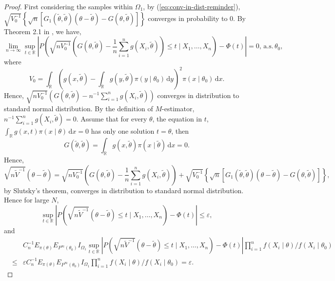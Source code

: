 \documentclass[oneside,english]{amsbook}
\numberwithin{section}{chapter}
\numberwithin{equation}{section}
\numberwithin{figure}{section}
\theoremstyle{plain}
\theoremstyle{plain}
\theoremstyle{definition}
\theoremstyle{plain}
\theoremstyle{plain}
\theoremstyle{remark}
\theoremstyle{definition}
\theoremstyle{definition}
\newcommand{\diff}{\,\mathrm{d}}
\newcommand{\ascv}{\,\mathrm{a.s.}\,}
\begin{document}
\begin{proof}
First considering the samples within $\Omega_{1}$, by (\ref{eq:conv-in-dist-reminder}),
$\sqrt{V_{0}^{-1}}\left\{ \sqrt{n}\left[G_{1}\left(\tilde{\theta},\tilde{\theta}\right)\left(\theta-\tilde{\theta}\right)-G\left(\theta,\tilde{\theta}\right)\right]\right\} $
converges in probability to 0. By Theorem 2.1 in \citet{rivoirard2012bernstein},
we have, 
\begin{equation}
\lim_{n\rightarrow\infty}\sup_{t\in\mathbb{R}}\left|P\left(\sqrt{nV_{0}^{-1}}\left(G\left(\theta,\tilde{\theta}\right)-\frac{1}{n}\sum_{i=1}^{n}g\left(X_{i},\tilde{\theta}\right)\right)\le t\mid X_{1},\ldots,X_{n}\right)-\Phi\left(t\right)\right|=0,\ascv\theta_{0},\label{eq:conv-in-dist-est-eq}
\end{equation}
where 
\[
V_{0}=\int_{\mathbb{R}}\left(g\left(x,\tilde{\theta}\right)-\int_{\mathbb{R}}g\left(y,\tilde{\theta}\right)\pi\left(y\mid\theta_{0}\right)\diff y\right)^{2}\pi\left(x\mid\theta_{0}\right)\diff x.
\]
Hence, $\sqrt{nV_{0}^{-1}}\left(G\left(\theta,\tilde{\theta}\right)-n^{-1}\sum_{i=1}^{n}g\left(X_{i},\tilde{\theta}\right)\right)$
converges in distribution to standard normal distribution. By the
definition of $M$-estimator, $n^{-1}\sum_{i=1}^{n}g\left(X_{i},\tilde{\theta}\right)=0$.
Assume that for every $\theta$, the equation in $t$, $\int_{\mathbb{R}}g\left(x,t\right)\pi\left(x\mid\theta\right)\diff x=0$
has only one solution $t=\theta$, then 
\[
G\left(\tilde{\theta},\tilde{\theta}\right)=\int_{\mathbb{R}}g\left(x,\tilde{\theta}\right)\pi\left(x\mid\tilde{\theta}\right)\diff x=0.
\]
Hence,
\[
\sqrt{n\tilde{V}^{-1}}\left(\theta-\tilde{\theta}\right)=\sqrt{nV_{0}^{-1}}\left(G\left(\theta,\tilde{\theta}\right)-\frac{1}{n}\sum_{i=1}^{n}g\left(X_{i},\tilde{\theta}\right)\right)+\sqrt{V_{0}^{-1}}\left\{ \sqrt{n}\left[G_{1}\left(\tilde{\theta},\tilde{\theta}\right)\left(\theta-\tilde{\theta}\right)-G\left(\theta,\tilde{\theta}\right)\right]\right\} ,
\]
by Slutsky's theorem, converges in distribution to standard normal
distribution. Hence for large $N$, 
\[
\sup_{t\in\mathbb{R}}\left|P\left(\sqrt{n\tilde{V}^{-1}}\left(\theta-\tilde{\theta}\right)\le t\mid X_{1},\ldots,X_{n}\right)-\Phi\left(t\right)\right|\le\varepsilon,
\]
and 
\begin{eqnarray}
 &  & C_{n}^{-1}E_{\pi\left(\theta\right)}E_{P^{\infty}\left(\theta_{0}\right)}I_{\Omega_{1}}\sup_{t\in\mathbb{R}}\left|P\left(\sqrt{n\tilde{V}^{-1}}\left(\theta-\tilde{\theta}\right)\le t\mid X_{1},\ldots,X_{n}\right)-\Phi\left(t\right)\right|\prod_{i=1}^{n}f\left(X_{i}\mid\theta\right)/f\left(X_{i}\mid\theta_{0}\right)\nonumber \\
 & \le & \varepsilon C_{n}^{-1}E_{\pi\left(\theta\right)}E_{P^{\infty}\left(\theta_{0}\right)}I_{\Omega_{1}}\prod_{i=1}^{n}f\left(X_{i}\mid\theta\right)/f\left(X_{i}\mid\theta_{0}\right)=\varepsilon.\label{eq:conv-with-omega1}
\end{eqnarray}



\end{proof}
\end{document}
